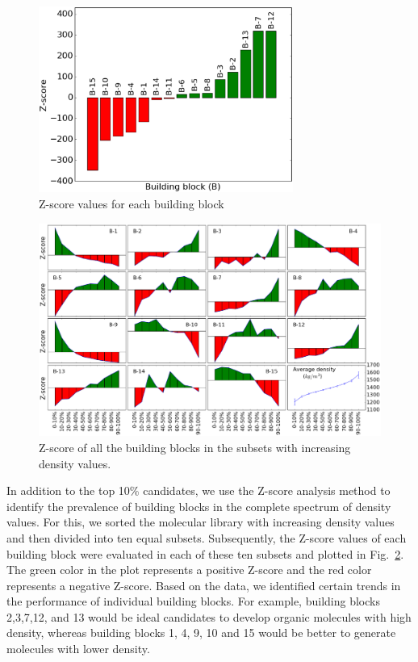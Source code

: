 \begin{figure}[htbp] 
	\centering
	\includegraphics[width=0.744\textwidth]{Chapter-6/Figures/BB_top_Z.eps}
	\caption{Z-score values for each building block}
	\label{fig:BB_top_Z_C6} 
\end{figure} 

\begin{figure}[htbp] 
	\centering
	\includegraphics[width=1.0\textwidth]{Chapter-6/Figures/All_BB_Z.eps}
	\caption{Z-score of all the building blocks in the subsets with increasing density values.} 
	\label{fig:BB_all_Z} 
\end{figure}

In addition to the top 10\% candidates, we use the Z-score analysis method to identify the prevalence of building blocks in the complete spectrum of density values. For this, we sorted the molecular library with increasing density values and then divided into ten equal subsets. Subsequently, the Z-score values of each building block were evaluated in each of these ten subsets and plotted in Fig.\ \ref{fig:BB_all_Z}. The green color in the plot represents a positive Z-score and the red color represents a negative Z-score. Based on the data, we identified certain trends in the performance of individual building blocks. For example, building blocks 2,3,7,12, and 13 would be ideal candidates to develop organic molecules with high density, whereas building blocks 1, 4, 9, 10 and 15 would be better to generate molecules with lower density. %


